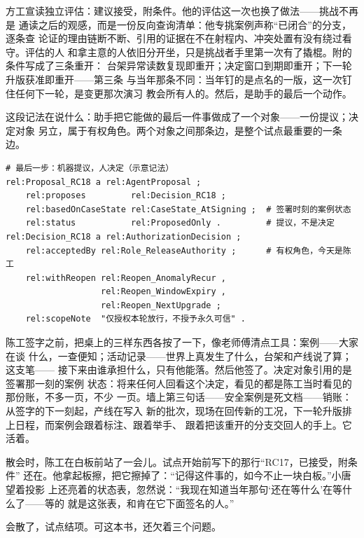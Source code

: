 方工宣读独立评估：建议接受，附条件。他的评估这一次也换了做法——挑战不再是
通读之后的观感，而是一份反向查询清单：他专挑案例声称“已闭合”的分支，逐条查
论证的理由链断不断、引用的证据在不在射程内、冲突处置有没有绕过看守。评估的人
和拿主意的人依旧分开坐，只是挑战者手里第一次有了撬棍。附的条件写成了三条重开：
台架异常读数复现即重开；决定窗口到期即重开；下一轮升版获准即重开——第三条
与当年那条不同：当年钉的是点名的一版，这一次钉住任何下一轮，是变更那次演习
教会所有人的。然后，是助手的最后一个动作。

这段记法在说什么：助手把它能做的最后一件事做成了一个对象——一份提议；决定对象
另立，属于有权角色。两个对象之间那条边，是整个试点最重要的一条边。

\nopagebreak[4]
\begin{codebox}
\begin{Verbatim}[fontsize=\small,breaklines=true,breakanywhere=true,breaksymbolleft={},breaksymbolright={}]
# 最后一步：机器提议，人决定（示意记法）
rel:Proposal_RC18 a rel:AgentProposal ;
    rel:proposes         rel:Decision_RC18 ;
    rel:basedOnCaseState rel:CaseState_AtSigning ;  # 签署时刻的案例状态
    rel:status           rel:ProposedOnly .         # 提议，不是决定
rel:Decision_RC18 a rel:AuthorizationDecision ;
    rel:acceptedBy rel:Role_ReleaseAuthority ;      # 有权角色，今天是陈工
    rel:withReopen rel:Reopen_AnomalyRecur ,
                   rel:Reopen_WindowExpiry ,
                   rel:Reopen_NextUpgrade ;
    rel:scopeNote  "仅授权本轮放行，不授予永久可信" .
\end{Verbatim}
\end{codebox}

陈工签字之前，把桌上的三样东西各按了一下，像老师傅清点工具：案例——大家在谈
什么，一查便知；活动记录——世界上真发生了什么，台架和产线说了算；这支笔——
接下来由谁承担什么，只有他能落。然后他签了。决定对象引用的是签署那一刻的案例
状态：将来任何人回看这个决定，看见的都是陈工当时看见的那份账，不多一页，不少
一页。墙上第三句话——安全案例是死文档——销账：从签字的下一刻起，产线在写入
新的批次，现场在回传新的工况，下一轮升版排上日程，而案例会跟着标注、跟着举手、
跟着把该重开的分支交回人的手上。它活着。

散会时，陈工在白板前站了一会儿。试点开始前写下的那行“RC17，已接受，附条件”
还在。他拿起板擦，把它擦掉了：“记得这件事的，如今不止一块白板。”小唐望着投影
上还亮着的状态表，忽然说：“我现在知道当年那句‘还在等什么’在等什么了——等的
就是这张表，和肯在它下面签名的人。”

会散了，试点结项。可这本书，还欠着三个问题。

